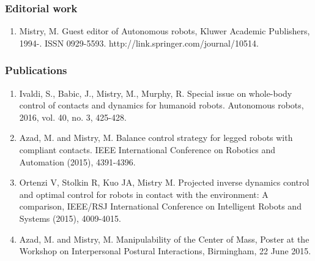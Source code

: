 \subsubsection{Editorial work}

\begin{enumerate}
	
\item Mistry, M. Guest editor of Autonomous robots, Kluwer Academic Publishers, 1994-. ISSN 0929-5593. http://link.springer.com/journal/10514.

\end{enumerate}


\subsubsection{Publications}

\begin{enumerate}
\item Ivaldi, S., Babic, J., Mistry, M., Murphy, R. Special issue on whole-body control of contacts and dynamics for humanoid robots. Autonomous robots, 2016, vol. 40, no. 3, 425-428.

\item Azad, M. and Mistry, M. Balance control strategy for legged robots with compliant contacts.  IEEE International Conference on Robotics and Automation (2015), 4391-4396.

\item Ortenzi V, Stolkin R, Kuo JA, Mistry M. Projected inverse dynamics control and optimal control for robots in contact with the environment: A comparison, IEEE/RSJ International Conference on Intelligent Robots and Systems (2015), 4009-4015.

\item Azad, M. and Mistry, M. Manipulability of the Center of Mass, Poster at the Workshop on Interpersonal Postural Interactions, Birmingham, 22 June 2015.

\end{enumerate}
	

